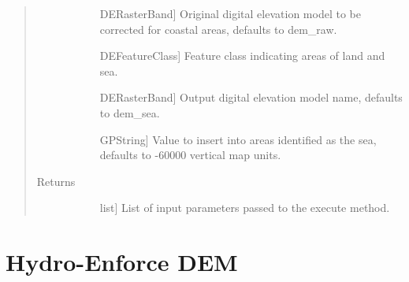 \documentclass[letterpaper,10pt,english]{sphinxmanual}
\begin{document}
\begin{fulllineitems}
\begin{fulllineitems}
\begin{quote}
\begin{description}
\begin{description}
\item[{}] \leavevmode{[}DERasterBand{]}
Original digital elevation model to be corrected for coastal areas, defaults to dem\_raw.

\item[{}] \leavevmode{[}DEFeatureClass{]}
Feature class indicating areas of land and sea.

\item[{}] \leavevmode{[}DERasterBand{]}
Output digital elevation model name, defaults to dem\_sea.

\item[{}] \leavevmode{[}GPString{]}
Value to insert into areas identified as the sea, defaults to -60000 vertical map units.

\end{description}

\item[{Returns}] \leavevmode\begin{description}
\item[{}] \leavevmode{[}list{]}
List of input parameters passed to the execute method.

\end{description}

\end{description}\end{quote}

\end{fulllineitems}


\end{fulllineitems}



\section{Hydro-Enforce DEM}
\label{\detokenize{StreamStats_DataPrep:hydro-enforce-dem}}
\end{document}
